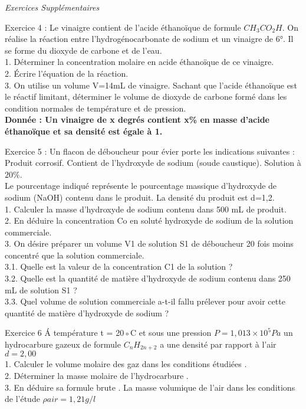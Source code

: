 \documentclass[12pt, french]{article}
\begin{document}
\begin{center}
   \Large{ \em{Exercices Supplémentaires}}
\end{center}
\begin{Box2}{Exercice 4 : }
Le vinaigre contient de l'acide éthanoïque de formule $CH_3CO_2H$. On réalise la réaction entre l'hydrogénocarbonate de sodium et un vinaigre de 6°. Il se forme du dioxyde de carbone et de l'eau.
\\1. Déterminer la concentration molaire en acide éthanoïque de ce vinaigre.
\\2. Écrire l'équation de la réaction.
\\3. On utilise un volume V=14mL de vinaigre. Sachant que l'acide éthanoïque est le réactif limitant, déterminer le volume de dioxyde de carbone formé dans les condition normales de température et de pression.
   \\\textbf{Donnée : Un vinaigre de x degrés contient x\% en masse d'acide éthanoïque et sa densité est égale à 1.}

\end{Box2}

\begin{Box2}{Exercice 5 :}
Un flacon de déboucheur pour évier porte les indications suivantes :
\\Produit corrosif. Contient de l’hydroxyde de sodium (soude caustique). Solution à $20\%$.
\\Le pourcentage indiqué représente le pourcentage massique d’hydroxyde de sodium (NaOH) contenu dans le produit.
La densité du produit est d=1,2.
\\1. Calculer la masse d’hydroxyde de sodium contenu dans 500 mL de produit.
\\2. En déduire la concentration Co en soluté hydroxyde de sodium de la solution commerciale.
\\3. On désire préparer un volume V1 de solution S1 de déboucheur 20 fois moins concentré que la solution
commerciale.
\\3.1. Quelle est la valeur de la concentration C1 de la solution ?
\\3.2. Quelle est la quantité de matière d’hydroxyde de sodium contenu dans 250 mL de solution S1 ?
\\3.3. Quel volume de solution commerciale a-t-il fallu prélever pour avoir cette quantité de matière
d’hydroxyde de sodium ?
\end{Box2}

\begin{Box2}{Exercice 6}
Á température t = 20◦C et sous une pression $P = 1, 013 × 10^5Pa$ un hydrocarbure gazeux de formule
   $C_nH_{2n+2}$ a une densité par rapport à l’air $d = 2, 00$
\\1. Calculer le volume molaire des gaz dans les conditions étudiées .
\\2. Déterminer la masse molaire de l’hydrocarbure .
   \\3. En déduire sa formule brute . La masse volumique de l’air dans les conditions de l’étude $\rho{air} = 1, 21g/l$
\end{Box2}
\end{document}
